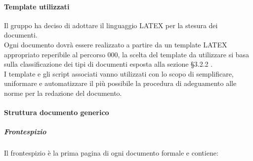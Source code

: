 			\paragraph{Template utilizzati }
				Il gruppo ha deciso di adottare il linguaggio LATEX per la stesura dei documenti. \\
				Ogni documento dovrà essere realizzato a partire da un template LATEX appropriato reperibile al percorso 000, la scelta del template da utilizzare si basa sulla classificazione dei tipi di documenti esposta alla sezione §3.2.2 .\\
				I template e gli script associati vanno utilizzati con lo scopo di semplificare, uniformare e automatizzare il più possibile la procedura di adeguamento alle norme per la redazione del documento.\\
			\paragraph{Struttura documento generico}
				\subparagraph{Frontespizio}
					Il frontespizio è la prima pagina di ogni documento formale e contiene: \\
